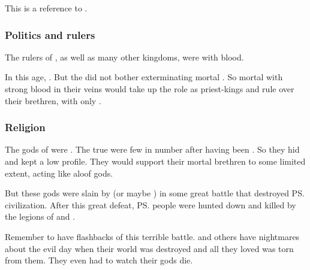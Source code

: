 This is a reference to \cite{RHCharles:BookofEnoch}.






\subsubsection{Politics and rulers}
The rulers of \Numah, as well as many other \nephil kingdoms, were \nephilim with \aryoth blood. 

In this age, . 
But the \dragons did not bother exterminating mortal \nephilim. 
So mortal \nephilim with strong \aryoth blood in their veins would take up the role as priest-kings and rule over their brethren, with only . 





\subsubsection{Religion}
The gods of \Numah{} were . 
The true \aryothim were few in number after having been .
So they hid and kept a low profile. 
They would support their mortal brethren to some limited extent, acting like aloof gods. 

But these gods were slain by \dragons{} (or maybe \quiljaaran) in some great battle that destroyed \ps{\Numah} civilization. 
After this great defeat, \ps{\Semiza} people were hunted down and killed by the legions of \cregorrs{} and \scathae. 

Remember to have flashbacks of this terrible battle.
\Semiza{} and others have nightmares about the evil day when their world was destroyed and all they loved was torn from them. 
They even had to watch their gods die. 

